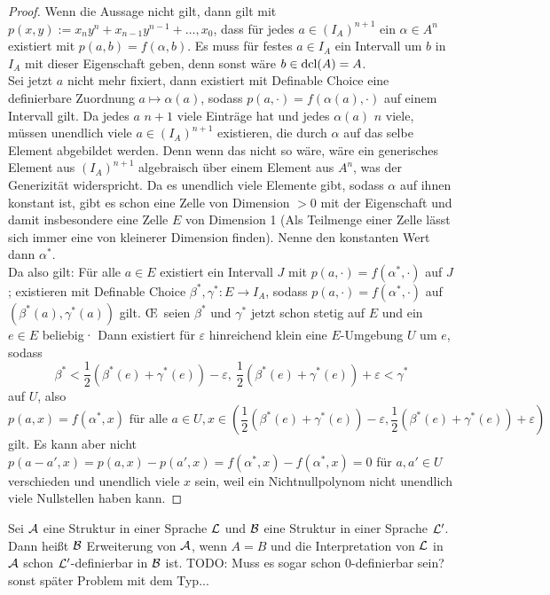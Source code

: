 \begin{proof}
	Wenn die Aussage nicht gilt, dann gilt mit $p(x,y):=x_ny^n+x_{n-1}y^{n-1}+\dots,x_0$, dass für jedes $a\in (I_A)^{n+1}$ ein $\alpha\in A^n$ existiert mit $p(a,b)=f(\alpha,b)$. Es muss für festes $a\in I_A$ ein Intervall um $b$ in $I_A$ mit dieser Eigenschaft geben, denn sonst wäre $b\in\operatorname{dcl}(A)=A$.\\
	Sei jetzt $a$ nicht mehr fixiert, dann existiert mit Definable Choice eine definierbare Zuordnung $a\mapsto\alpha(a)$, sodass $p(a,\cdot)=f(\alpha(a),\cdot)$ auf einem Intervall gilt. Da jedes $a$ $n+1$ viele Einträge hat und jedes $\alpha(a)$ $n$ viele, müssen unendlich viele $a\in (I_A)^{n+1}$ existieren, die durch $\alpha$ auf das selbe Element abgebildet werden. Denn wenn das nicht so wäre, wäre ein generisches Element aus $(I_A)^{n+1}$ algebraisch über einem Element aus $A^n$, was der Generizität widerspricht. Da es unendlich viele Elemente gibt, sodass $\alpha$ auf ihnen konstant ist, gibt es schon eine Zelle von Dimension $>0$ mit der Eigenschaft und damit insbesondere eine Zelle $E$ von Dimension 1 (Als Teilmenge einer Zelle lässt sich immer eine von kleinerer Dimension finden). Nenne den konstanten Wert dann $\alpha^*$.\\
	Da also gilt: Für alle $a\in E$ existiert ein Intervall $J$ mit $p(a,\cdot)=f(\alpha^*,\cdot)$ auf $J$; existieren mit Definable Choice $\beta^*,\gamma^*:E\rightarrow I_A$, sodass $p(a,\cdot)=f(\alpha^*,\cdot)$ auf $(\beta^*(a),\gamma^*(a))$ gilt. \OE\ seien $\beta^*$ und $\gamma^*$ jetzt schon stetig auf $E$ und ein $e\in E$ beliebig· Dann existiert für $\varepsilon$ hinreichend klein eine $E$-Umgebung $U$ um $e$, sodass $$\beta^*<\frac{1}{2}(\beta^*(e)+\gamma^*(e))-\varepsilon,\ \frac{1}{2}(\beta^*(e)+\gamma^*(e))+\varepsilon<\gamma^*$$ auf $U$, also $$p(a,x)=f(\alpha^*,x)\text{ für alle }a\in U,x\in(\frac{1}{2}(\beta^*(e)+\gamma^*(e))-\varepsilon,\frac{1}{2}(\beta^*(e)+\gamma^*(e))+\varepsilon)$$ gilt. Es kann aber nicht $p(a-a',x)=p(a,x)-p(a',x)=f(\alpha^*,x)-f(\alpha^*,x)=0$ für $a,a'\in U$ verschieden und unendlich viele $x$ sein, weil ein Nichtnullpolynom nicht unendlich viele Nullstellen haben kann.
\end{proof}

\newpage
\begin{definition}
	Sei $\mathcal{A}$ eine Struktur in einer Sprache $\mathcal{L}$ und $\mathcal{B}$ eine Struktur in einer Sprache $\mathcal{L}'$. Dann heißt $\mathcal{B}$ Erweiterung von $\mathcal{A}$, wenn $A=B$ und die Interpretation von $\mathcal{L}$ in $\mathcal{A}$ schon $\mathcal{L}'$-definierbar in $\mathcal{B}$ ist. TODO: Muss es sogar schon 0-definierbar sein? sonst später Problem mit dem Typ...
\end{definition}

